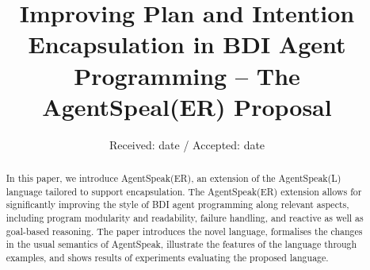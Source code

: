 \documentclass[smallextended]{svjour3}       %
\begin{document}
\title{Improving Plan and Intention Encapsulation in BDI Agent Programming -- The AgentSpeal(ER) Proposal 
}


\author{}



\date{Received: date / Accepted: date}


\maketitle

\begin{abstract}
In this paper, we introduce AgentSpeak(ER), an extension of the AgentSpeak(L) language tailored to support encapsulation. 
%
The AgentSpeak(ER) extension allows for significantly improving the style of BDI agent programming along relevant aspects, including program modularity and readability, failure handling, and reactive as well as goal-based reasoning. 
%
The paper introduces the novel language, formalises the changes in the usual semantics of AgentSpeak, illustrate the features of the language through examples, and shows results of experiments evaluating the proposed language.
\end{abstract}











\end{document}
